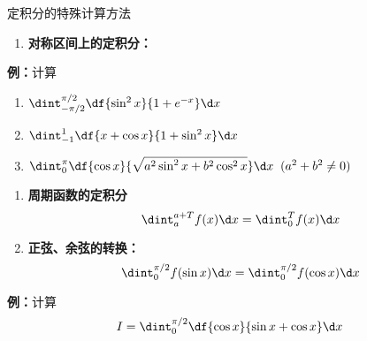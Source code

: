 \begin{frame}{定积分的特殊计算方法}
	\linespread{1.5}
	\begin{enumerate}\pause 
	  \item {\bf 对称区间上的定积分：}%
	\end{enumerate}
	\pause
	\begin{exampleblock}{{\bf 例：}计算}
		\begin{enumerate}
		  \item $\dint_{-\pi/2}^{\pi/2}\df{\sin^2x}{1+e^{-x}}\d x$
		  \item $\dint_{-1}^1\df{x+\cos x}{1+\sin^2x}\d x$
		  \item $\dint_0^{\pi}\df{\cos x}{\sqrt{a^2\sin^2x+b^2\cos^2x}}\d
		  x\;\;(a^2+b^2\ne 0)$
		\end{enumerate}
	\end{exampleblock}
\end{frame}


\begin{frame}
	\linespread{1.5}
	\begin{enumerate}
	  \addtocounter{enumi}{1}\pause 
	  \item {\bf 周期函数的定积分}\pause 
	  $$\dint_a^{a+T}f(x)\d x=\dint_0^{T}f(x)\d x$$\pause 
	  \vspace{-1em}
	  \item {\bf 正弦、余弦的转换：}\pause $$\dint_0^{\pi/2}f(\sin
	  x)\d x=\dint_0^{\pi/2}f(\cos x)\d x$$
	\end{enumerate}
	\pause
	\begin{exampleblock}{{\bf 例：}计算}
		$$I=\dint_0^{\pi/2}\df{\cos x}{\sin x+\cos x}\d x$$
	\end{exampleblock}
\end{frame}

